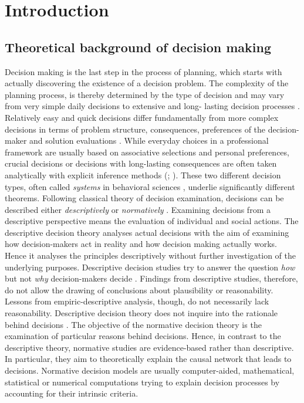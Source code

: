 
\chapter{Introduction}
\label{chap:intro}
\newpage
\section{Theoretical background of decision making}
\label{sec:intro:bg}
Decision making is the last step in the process of planning, which starts with actually discovering the existence of a decision problem. The complexity of the planning process, is thereby determined by the type of decision and may vary from very simple daily decisions to extensive and long- lasting decision processes \citep[p. 3-4]{kangas_2015}. Relatively easy and quick decisions differ fundamentally from more complex decisions in terms of problem structure, consequences, preferences of the decision-maker and solution evaluations \citep[p. 807-808]{keeney_1982}. While everyday choices in a professional framework are usually based on associative selections and personal preferences, crucial decisions or decisions with long-lasting consequences are often taken analytically with explicit inference methods (\citealp[p. 659, 672]{stanovich_2000}; \citealp[p. 3]{kangas_2015}). These two different decision types, often called \textit{systems} in behavioral sciences \citep[e.g.][p. 658]{stanovich_2000}, underlie significantly different theorems. Following classical theory of decision examination, decisions can be described either \textit{descriptively} or \textit{normatively} \citep[p. 6]{bitz_2005}. Examining decisions from a descriptive perspective means the evaluation of individual and social actions. The descriptive decision theory analyses actual decisions with the aim of examining how decision-makers act in reality and how decision making actually works. Hence it analyses the principles descriptively without further investigation of the underlying purposes. Descriptive decision studies try to answer the question \textit{how} but not \textit{why} decision-makers decide \citep[p. 499-501]{simon_1979}. Findings from descriptive studies, therefore, do not allow the drawing of conclusions about plausibility or reasonability. Lessons from empiric-descriptive analysis, though, do not necessarily lack reasonability. Descriptive decision theory does not inquire into the rationale behind decisions \citep[p. 500]{simon_1979}. The objective of the normative decision theory is the examination of particular reasons behind decisions. Hence, in contrast to the descriptive theory, normative studies are evidence-based rather than descriptive. In particular, they aim to theoretically explain the causal network that leads to decisions. Normative decision models are usually computer-aided, mathematical, statistical or numerical computations trying to explain decision processes by accounting for their intrinsic criteria. 